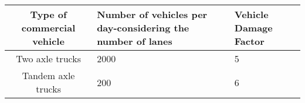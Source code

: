 \begin{tabular}{|c|p{5cm}|p{3cm}|}
    \hline
    Type of commercial vehicle & Number of vehicles per day-considering the number of lanes & Vehicle Damage Factor\\
    \hline
    Two axle trucks & 2000 & 5\\
    \hline
    Tandem axle trucks & 200 & 6\\
    \hline
\end{tabular}